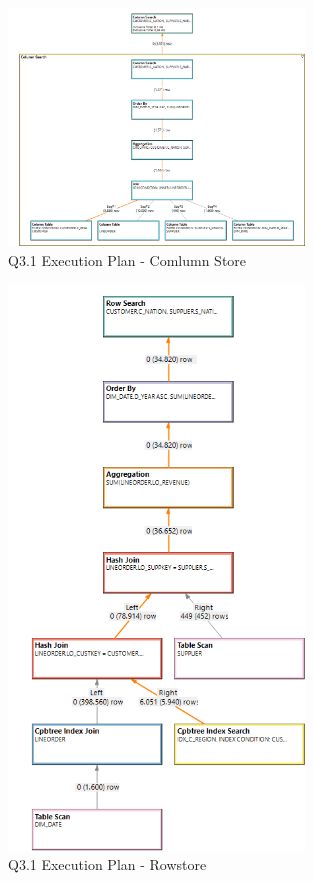 \begin{figure}[H]
	\centering
	\includegraphics[width=0.7\textwidth]{images/q3-1-col-exec.png}
	\caption{Q3.1 Execution Plan - Comlumn Store}\label{auswertung:q3.1:col}
\end{figure}
\begin{figure}[H]
	\centering
	\includegraphics[width=0.7\textwidth]{images/q3-1-row-exec.png}
	\caption{Q3.1 Execution Plan - Rowstore}\label{auswertung:q3.1:row}
\end{figure}
